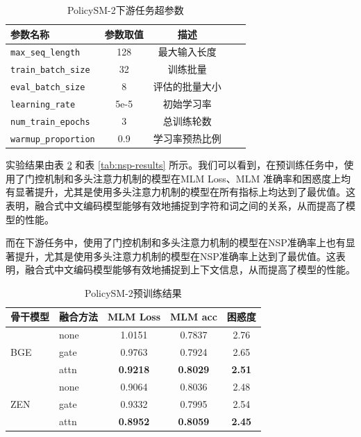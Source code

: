 \documentclass[12pt, a4paper]{ctexart}
\begin{document}
\begin{table}[H]
    \centering
    \begin{tabular}{lcccc}
        \toprule
        \textbf{参数名称} & \textbf{参数取值} & \textbf{描述} \\ 
        \midrule
        \texttt{max\_seq\_length} & 128 & 最大输入长度\\ 
        \texttt{train\_batch\_size} & 32 & 训练批量 \\ 
        \texttt{eval\_batch\_size} & 8 & 评估的批量大小 \\
        \texttt{learning\_rate} & 5e-5 & 初始学习率 \\
        \texttt{num\_train\_epochs} & 3 & 总训练轮数 \\ 
        \texttt{warmup\_proportion} & 0.9 & 学习率预热比例 \\
        \bottomrule
    \end{tabular}
    \caption{PolicySM-2下游任务超参数}
    \label{tab:seqlevel_hyperparameters_2}
\end{table}

实验结果由表 \ref{tab:pretrain-results} 和表 \ref{tab:nsp-results} 所示。我们可以看到，在预训练任务中，使用了门控机制和多头注意力机制的模型在MLM Loss、MLM 准确率和困惑度上均有显著提升，尤其是使用多头注意力机制的模型在所有指标上均达到了最优值。这表明，融合式中文编码模型能够有效地捕捉到字符和词之间的关系，从而提高了模型的性能。

而在下游任务中，使用了门控机制和多头注意力机制的模型在NSP准确率上也有显著提升，尤其是使用多头注意力机制的模型在NSP准确率上达到了最优值。这表明，融合式中文编码模型能够有效地捕捉到上下文信息，从而提高了模型的性能。

\begin{table}[htbp]
    \centering
    \begin{tabular}{llccc}
      \toprule
      骨干模型 & 融合方法 & MLM Loss & MLM acc & 困惑度 \\
      \midrule
      \multirow{3}{*}{BGE}
        & none & 1.0151 & 0.7837 & 2.76 \\
        & gate & 0.9763 & 0.7924 & 2.65 \\
        & attn & \textbf{0.9218} & \textbf{0.8029} & \textbf{2.51} \\
      \midrule
      \multirow{3}{*}{ZEN}
        & none & 0.9064 & 0.8036 & 2.48 \\
        & gate & 0.9332 & 0.7995 & 2.54 \\
        & attn & \textbf{0.8952} & \textbf{0.8059} & \textbf{2.45} \\
      \bottomrule
    \end{tabular}
    \caption{PolicySM-2预训练结果}
    \label{tab:pretrain-results}
  \end{table}
  
\end{document}
